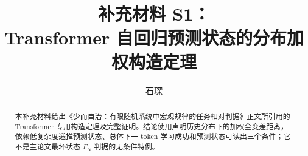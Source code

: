 \documentclass[UTF8,fontset=fandol,11pt,a4paper]{ctexart}
\title{\bfseries 补充材料 S1：\\Transformer 自回归预测状态的分布加权构造定理}
\author{石琛}
\date{}
\begin{document}
\maketitle

\begin{abstract}
本补充材料给出《少而自治：有限随机系统中宏观规律的任务相对判据》正文所引用的 Transformer 专用构造定理及完整证明。结论使用声明历史分布下的加权全变差距离，依赖低复杂度递推预测状态、总体下一 token 学习成功和预测状态可读出三个条件；它不是主论文最坏状态 $\Gamma_N$ 判据的无条件特例。
\end{abstract}

\tableofcontents
\clearpage

\end{document}
